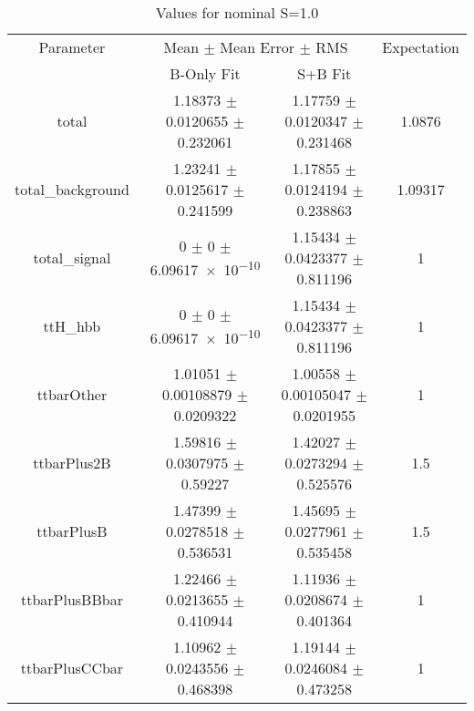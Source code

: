 \begin{table}
\centering
\caption{Values for nominal S=1.0}
\begin{tabular}{cccc}
\toprule
Parameter & \multicolumn{2}{c}{Mean $\pm$ Mean Error $\pm$ RMS} & Expectation\\
 & B-Only Fit & S+B Fit & \\
\midrule
total & \num{1.18373} $\pm$ \num{0.0120655} $\pm$ \num{0.232061} & \num{1.17759} $\pm$ \num{0.0120347} $\pm$ \num{0.231468} & \num{1.0876}\\
total\_background & \num{1.23241} $\pm$ \num{0.0125617} $\pm$ \num{0.241599} & \num{1.17855} $\pm$ \num{0.0124194} $\pm$ \num{0.238863} & \num{1.09317}\\
total\_signal & \num{0} $\pm$ \num{0} $\pm$ \num{6.09617e-10} & \num{1.15434} $\pm$ \num{0.0423377} $\pm$ \num{0.811196} & \num{1}\\
ttH\_hbb & \num{0} $\pm$ \num{0} $\pm$ \num{6.09617e-10} & \num{1.15434} $\pm$ \num{0.0423377} $\pm$ \num{0.811196} & \num{1}\\
ttbarOther & \num{1.01051} $\pm$ \num{0.00108879} $\pm$ \num{0.0209322} & \num{1.00558} $\pm$ \num{0.00105047} $\pm$ \num{0.0201955} & \num{1}\\
ttbarPlus2B & \num{1.59816} $\pm$ \num{0.0307975} $\pm$ \num{0.59227} & \num{1.42027} $\pm$ \num{0.0273294} $\pm$ \num{0.525576} & \num{1.5}\\
ttbarPlusB & \num{1.47399} $\pm$ \num{0.0278518} $\pm$ \num{0.536531} & \num{1.45695} $\pm$ \num{0.0277961} $\pm$ \num{0.535458} & \num{1.5}\\
ttbarPlusBBbar & \num{1.22466} $\pm$ \num{0.0213655} $\pm$ \num{0.410944} & \num{1.11936} $\pm$ \num{0.0208674} $\pm$ \num{0.401364} & \num{1}\\
ttbarPlusCCbar & \num{1.10962} $\pm$ \num{0.0243556} $\pm$ \num{0.468398} & \num{1.19144} $\pm$ \num{0.0246084} $\pm$ \num{0.473258} & \num{1}\\
\bottomrule
\end{tabular}
\end{table}